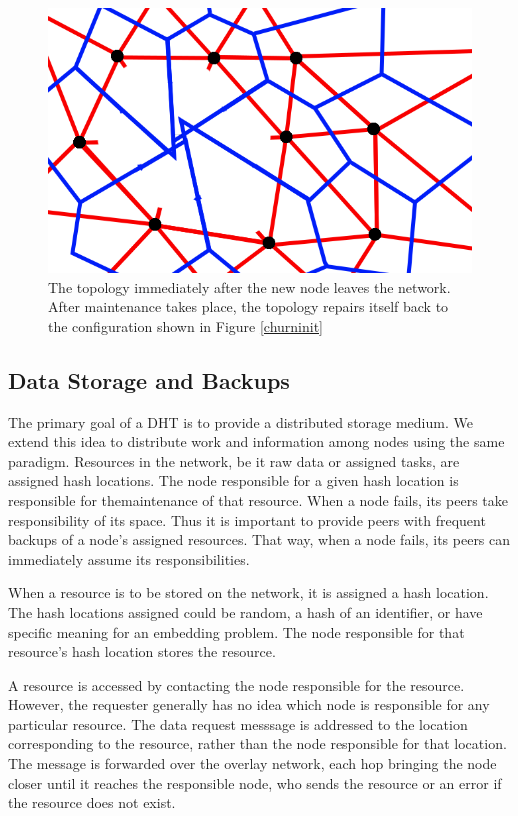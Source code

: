 \documentclass[11pt]{IEEEtran} %
\begin{document}
\begin{figure}
    \includegraphics[width=\linewidth]{voronoi-churn1}
    \caption{The topology immediately after the new node leaves the network. After maintenance takes place, the topology repairs itself back to the configuration shown in Figure \ref{churninit}}
    \label{churndrop}
\end{figure}


\subsection{Data Storage and Backups}
The primary goal of a DHT is to provide a distributed storage medium. We extend this idea  to distribute work and information among nodes using the same paradigm. Resources in the network, be it raw data or assigned tasks, are assigned hash locations. The node responsible for a given hash location is responsible for themaintenance of that resource. When a node fails, its peers take responsibility of its space. Thus it is important to provide peers with frequent backups of a node's assigned resources.  That way, when a node fails, its peers can immediately assume its responsibilities.

When a resource is to be stored on the network, it is assigned a hash location. The hash locations assigned could be random, a hash of an identifier, or have specific meaning for an embedding problem. The node responsible for that resource's hash location stores the resource.

A resource is accessed by contacting the node responsible for the resource.  However, the requester generally has no idea which node is responsible for any particular resource.  The data request messsage is addressed to the location corresponding to the resource, rather than the node responsible for that location.  The message is forwarded over the overlay network, each hop bringing the node closer until it reaches the responsible node, who sends the resource or an error if the resource does not exist.
\end{document}
